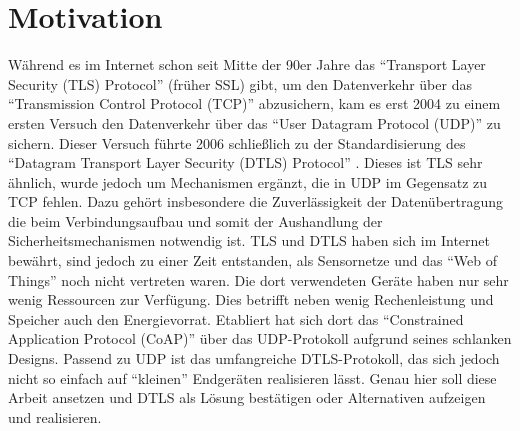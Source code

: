 \section{Motivation}
Während es im Internet schon seit Mitte der 90er Jahre das  "`Transport Layer Security (TLS) Protocol"' \cite{rfc5246} (früher SSL) gibt,
um den Datenverkehr über das "`Transmission Control Protocol (TCP)"' abzusichern, kam es erst 2004 zu einem ersten Versuch den Datenverkehr
über das "`User Datagram Protocol (UDP)"' zu sichern. Dieser Versuch führte 2006 schließlich zu der Standardisierung des "`Datagram Transport
Layer Security (DTLS) Protocol"' \cite{rfc6347}. Dieses ist TLS sehr ähnlich, wurde jedoch um Mechanismen ergänzt, die in UDP im Gegensatz
zu TCP fehlen. Dazu gehört insbesondere die Zuverlässigkeit der Datenübertragung die beim Verbindungsaufbau und somit der Aushandlung der
Sicherheitsmechanismen notwendig ist. TLS und DTLS haben sich im Internet bewährt, sind jedoch zu einer Zeit entstanden, als Sensornetze und das
"`Web of Things"' noch nicht vertreten waren. Die dort verwendeten Geräte haben nur sehr wenig Ressourcen zur Verfügung.
Dies betrifft neben wenig Rechenleistung und Speicher auch den Energievorrat. Etabliert hat sich dort das "`Constrained
Application Protocol (CoAP)"' \cite{draftcoap} über das UDP-Protokoll aufgrund seines schlanken Designs. Passend zu UDP ist
das umfangreiche DTLS-Protokoll, das sich jedoch nicht so einfach auf "`kleinen"' Endgeräten realisieren lässt.
Genau hier soll diese Arbeit ansetzen und DTLS als Lösung bestätigen oder Alternativen aufzeigen und realisieren.



